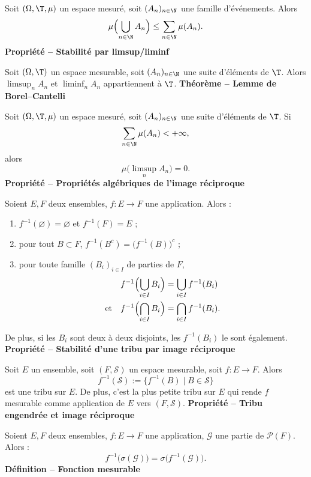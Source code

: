Soit $(\Omega,\T,\mu)$ un espace mesuré, soit $(A_n)_{n\in\N}$ une famille d’événements. Alors
\[\mu\Bigl(\bigcup_{n\in\N} A_n\Bigr)\le\sum_{n\in\N}\mu(A_n).\]
\textbf{Propriété – Stabilité par limsup/liminf}

Soit $(\Omega,\T)$ un espace mesurable, soit $(A_n)_{n\in\N}$ une suite d’éléments de $\T$. Alors $\limsup_n A_n$ et $\liminf_n A_n$ appartiennent à $\T$.
\textbf{Théorème – Lemme de Borel–Cantelli}

Soit $(\Omega,\T,\mu)$ un espace mesuré, soit $(A_n)_{n\in\N}$ une suite d’éléments de $\T$. Si
\[\sum_{n\in\N}\mu(A_n)<+\infty,\]
alors
\[\mu\bigl(\limsup_n A_n\bigr)=0.\]
\textbf{Propriété – Propriétés algébriques de l’image réciproque}

Soient $E,F$ deux ensembles, $f:E\to F$ une application. Alors :
\begin{enumerate}
\item $f^{-1}(\varnothing)=\varnothing$ et $f^{-1}(F)=E$ ;
\item pour tout $B\subset F$, $f^{-1}(B^c)=\bigl(f^{-1}(B)\bigr)^c$ ;
\item pour toute famille $(B_i)_{i\in I}$ de parties de $F$,
\[
\begin{aligned}
f^{-1}\Bigl(\bigcup_{i\in I}B_i\Bigr)&=\bigcup_{i\in I}f^{-1}(B_i)\\
\text{et}\quad f^{-1}\Bigl(\bigcap_{i\in I}B_i\Bigr)&=\bigcap_{i\in I}f^{-1}(B_i).
\end{aligned}
\]
\end{enumerate}
De plus, si les $B_i$ sont deux à deux disjoints, les $f^{-1}(B_i)$ le sont également.
\textbf{Propriété – Stabilité d’une tribu par image réciproque}

Soit $E$ un ensemble, soit $(F,\mathcal S)$ un espace mesurable, soit $f:E\to F$. Alors
\[f^{-1}(\mathcal S):=\{f^{-1}(B)\mid B\in\mathcal S\}\]
est une tribu sur $E$. De plus, c’est la plus petite tribu sur $E$ qui rende $f$ mesurable comme application de $E$ vers $(F,\mathcal S)$.
\textbf{Propriété – Tribu engendrée et image réciproque}

Soient $E,F$ deux ensembles, $f:E\to F$ une application, $\mathcal G$ une partie de $\mathcal P(F)$. Alors :
\[f^{-1}\bigl(\sigma(\mathcal G)\bigr)=\sigma\bigl(f^{-1}(\mathcal G)\bigr).\]
\textbf{Définition – Fonction mesurable}

